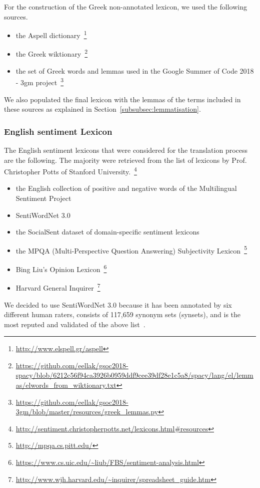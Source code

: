 For the construction of the Greek non-annotated lexicon,
we used the following sources.

\begin{itemize}
 \item the Aspell dictionary~\footnote{ \url{http://www.elspell.gr/aspell}}
 \item the Greek wiktionary~\footnote{ \url{https://github.com/eellak/gsoc2018-spacy/blob/6212c56f94ca3926b0959ddf9cee39df28e1c5a8/spacy/lang/el/lemmas/elwords_from_wiktionary.txt}}
 \item the set of Greek words and lemmas used
 in the Google Summer of Code 2018 - 3gm project~\footnote{ \url{https://github.com/eellak/gsoc2018-3gm/blob/master/resources/greek_lemmas.py}}
\end{itemize}

We also populated the final lexicon with the lemmas of the terms included in these sources as explained in Section~\ref{subsubsec:lemmatisation}.

\subsubsection{English sentiment Lexicon}
\label{subsubsec:english}

The English sentiment lexicons that were considered
for the translation process are the following.
The majority were retrieved from the list of lexicons by Prof. Christopher Potts
of Stanford University.~\footnote{ \url{http://sentiment.christopherpotts.net/lexicons.html#resources}}

\begin{itemize}
 \item the English collection of positive and negative words of the Multilingual Sentiment Project
 \item SentiWordNet 3.0~\cite{BES10}
 \item the SocialSent dataset of domain-specific sentiment lexicons~\cite{HCLJ16}
 \item the MPQA (Multi-Perspective Question Answering) Subjectivity Lexicon~\footnote{ \url{http://mpqa.cs.pitt.edu/}}
 \item Bing Liu's Opinion Lexicon~\footnote{ \url{https://www.cs.uic.edu/~liub/FBS/sentiment-analysis.html}}
 \item Harvard General Inquirer~\footnote{ \url{http://www.wjh.harvard.edu/~inquirer/spreadsheet_guide.htm}}
\end{itemize}

We decided to use SentiWordNet 3.0 because it has been annotated
by six different human raters,
consists of 117,659 synonym sets (synsets),
and is the most reputed and validated of the above list~\cite{BES10}.

